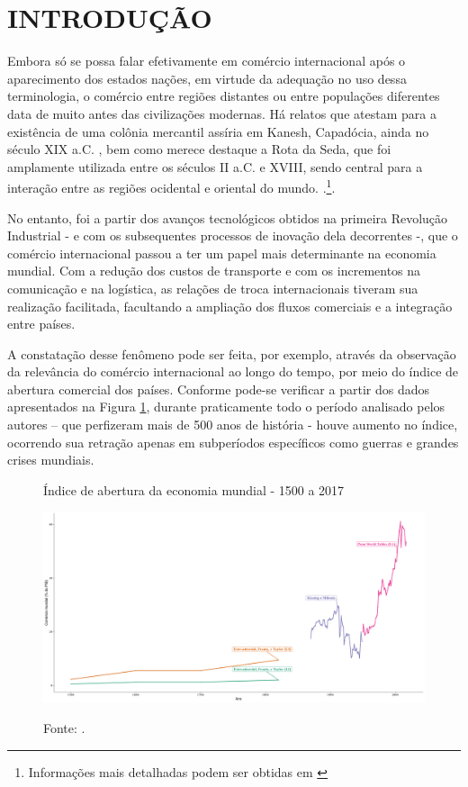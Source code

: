 \section{\textbf{INTRODUÇÃO}}

Embora só se possa falar efetivamente em comércio internacional após o aparecimento dos estados nações, em virtude da adequação no uso dessa terminologia, o comércio entre regiões distantes ou entre populações diferentes data de muito antes das civilizações modernas. Há relatos que atestam para a existência de uma colônia mercantil assíria em Kanesh, Capadócia, ainda no século XIX a.C. \cite{Stearns2001}, bem como merece destaque a Rota da Seda, que foi amplamente utilizada entre os séculos II a.C. e XVIII, sendo central para a interação entre as regiões ocidental e oriental do mundo. \cite{Elisseeff2000}.\footnote{Informações mais detalhadas podem ser obtidas em \cite{Junguito2016, Vanham2019}}.

No entanto, foi a partir dos avanços tecnológicos obtidos na primeira Revolução Industrial - e com os subsequentes processos de inovação dela decorrentes -, que o comércio internacional passou a ter um papel mais determinante na economia mundial. Com a redução dos custos de transporte e com os incrementos na comunicação e na logística, as relações de troca internacionais tiveram sua realização facilitada, facultando a ampliação dos fluxos comerciais e a integração entre países. 

A constatação desse fenômeno pode ser feita, por exemplo, através da observação da relevância do comércio internacional ao longo do tempo, por meio do índice de abertura comercial dos países. Conforme pode-se verificar a partir dos dados apresentados na Figura \ref{fig:1}, durante praticamente todo o período analisado pelos autores – que perfizeram mais de 500 anos de história - houve aumento no índice, ocorrendo sua retração apenas em subperíodos específicos como guerras e grandes crises mundiais.

\begin{figure}[H]
	\centering
		\caption{Índice de abertura da economia mundial - 1500 a 2017 }
		{}%
        \includegraphics[width=\linewidth]{Figuras/globalizacao.png}
	\label{fig:1}
	\caption*{\RaggedRight  Fonte: \cite{Estevadeordal2003, Feenstra2015, Klasing2014}.}
\end{figure}

